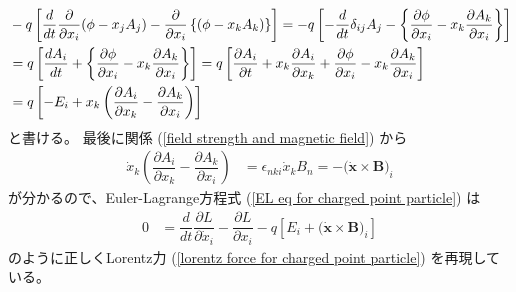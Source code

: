 \begin{align}
  &
- q \left[
  \dfrac{d}{dt}
    \dfrac{\partial}{\partial \dot{x}_i}
      (\phi - \dot{x}_j A_j)
  -
    \dfrac{\partial}{\partial x_i}
    \left\{
      (\phi - \dot{x}_k A_k)
    \right\}
\right]
=
- q \left[
  - \dfrac{d}{dt}
    \delta_{ij} A_j
  -
    \left\{
      \dfrac{\partial \phi}{\partial x_i}
    -
      \dot{x}_k
      \dfrac{\partial A_k}{\partial x_i}
    \right\}
\right]
\notag\\&
=
  q \left[
  \dfrac{d A_i}{dt}
  +
    \left\{
      \dfrac{\partial \phi}{\partial x_i}
    -
      \dot{x}_k
      \dfrac{\partial A_k}{\partial x_i}
    \right\}
\right]
=
q \left[
    \dfrac{\partial A_i}{\partial t}
  +
    \dot{x}_k
    \dfrac{\partial A_i}{\partial x_k}
  +
    \dfrac{\partial \phi}{\partial x_i}
  -
    \dot{x}_k
    \dfrac{\partial A_k}{\partial x_i}
\right]
\notag\\&
=
q \left[
    - E_i
  +
    \dot{x}_k
    \left(
      \dfrac{\partial A_i}{\partial x_k}
    -
      \dfrac{\partial A_k}{\partial x_i}
    \right)
\right]
\end{align}
と書ける。
最後に関係
(\ref{field strength and magnetic field})
から
\begin{align}
  \dot{x}_k
  \left(
    \dfrac{\partial A_i}{\partial x_k}
  -
    \dfrac{\partial A_k}{\partial x_i}
  \right)
&=
  \epsilon_{nki} \dot{x}_k B_n
=
  - \big(
    \dot{\bm{x}} \times \bm{B}
  \big)_i
\end{align}
が分かるので、Euler-Lagrange方程式
(\ref{EL eq for charged point particle})
は
\begin{align}
  0
&=
  \dfrac{d}{dt}
    \dfrac{\partial L}{\partial \dot{x}_i}
  -
    \dfrac{\partial L}{\partial x_i}
- q \left[
    E_i
  + \big(
      \dot{\bm{x}} \times \bm{B}
    \big)_i
\right]
\end{align}
のように正しくLorentz力
(\ref{lorentz force for charged point particle})
を再現している。

